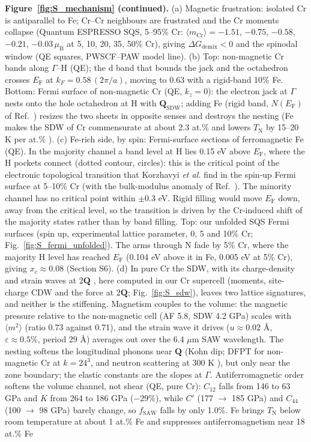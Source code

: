 \documentclass[final,3p,times]{elsarticle}
\begin{document}
\clearpage
\noindent\textbf{Figure~\ref{fig:S_mechanism} (continued).} (a) Magnetic frustration: isolated Cr is antiparallel to Fe; Cr--Cr neighbours are frustrated and the Cr moments collapse (Quantum ESPRESSO SQS, 5--95\% Cr: $\langle m_{\mathrm{Cr}}\rangle=-1.51$, $-0.75$, $-0.58$, $-0.21$, $-0.03\,\mu_{\mathrm{B}}$ at 5, 10, 20, 35, 50\% Cr), giving $\Delta G_{\mathrm{demix}}<0$ and the spinodal window (QE squares, PWSCF--PAW model line). (b) Top: non-magnetic Cr bands along $\Gamma$--H (QE); the d band that bounds the jack and the octahedron crosses $E_{\mathrm F}$ at $k_F=0.58\,(2\pi/a)$, moving to 0.63 with a rigid-band 10\% Fe. Bottom: Fermi surface of non-magnetic Cr (QE, $k_z=0$): the electron jack at $\Gamma$ nests onto the hole octahedron at H with $\mathbf{Q}_{\mathrm{SDW}}$; adding Fe (rigid band, $N(E_{\mathrm F})$ of Ref.~\cite{moruzzi1978calculated}) resizes the two sheets in opposite senses and destroys the nesting (Fe makes the SDW of Cr commensurate at about 2.3 at.\% and lowers $T_{\mathrm N}$ by 15--20 K per at.\% \cite{fawcett1988spin}). (c) Fe-rich side, by spin: Fermi-surface sections of ferromagnetic Fe (QE). In the majority channel a band level at H lies 0.15 eV above $E_{\mathrm F}$, where the H pockets connect (dotted contour, circles): this is the critical point of the electronic topological transition that Korzhavyi \textit{et al.} find in the spin-up Fermi surface at 5--10\% Cr \cite{korzhavyi2009electronic} (with the bulk-modulus anomaly of Ref.~\cite{olsson2003abinitio}). The minority channel has no critical point within $\pm0.3$ eV. Rigid filling would move $E_{\mathrm F}$ down, away from the critical level, so the transition is driven by the Cr-induced shift of the majority states rather than by band filling. Top: our unfolded SQS Fermi surfaces (spin up, experimental lattice parameter, 0, 5 and 10\% Cr; Fig.~\ref{fig:S_fermi_unfolded}). The arms through N fade by 5\% Cr, where the majority H level has reached $E_{\mathrm F}$ (0.104 eV above it in Fe, 0.005 eV at 5\% Cr), giving $x_c\approx0.08$ (Section S6). (d) In pure Cr the SDW, with its charge-density and strain waves at $2\mathbf{Q}$ \cite{fawcett1988spin}, here computed in our Cr supercell (moments, site-charge CDW and the force at $2\mathbf{Q}$; Fig.~\ref{fig:S_sdw}), leaves two lattice signatures, and neither is the stiffening. Magnetism couples to the volume: the magnetic pressure relative to the non-magnetic cell (AF 5.8, SDW 4.2 GPa) scales with $\langle m^2\rangle$ (ratio 0.73 against 0.71), and the strain wave it drives ($u\approx0.02$ \AA, $\varepsilon\approx0.5\%$, period 29 \AA) averages out over the 6.4 $\mu$m SAW wavelength. The nesting softens the longitudinal phonons near $\mathbf{Q}$ (Kohn dip; DFPT for non-magnetic Cr at $k=24^3$, and neutron scattering at 300 K \cite{shaw1971investigation}), but only near the zone boundary; the elastic constants are the slopes at $\Gamma$. Antiferromagnetic order softens the volume channel, not shear (QE, pure Cr): $C_{12}$ falls from 146 to 63 GPa and $K$ from 264 to 186 GPa ($-29\%$), while $C'$ (177 $\to$ 185 GPa) and $C_{44}$ (100 $\to$ 98 GPa) barely change, so $f_{\mathrm{SAW}}$ falls by only 1.0\%. Fe brings $T_{\mathrm N}$ below room temperature at about 1 at.\% Fe and suppresses antiferromagnetism near 18 at.\% Fe 
\end{document}
